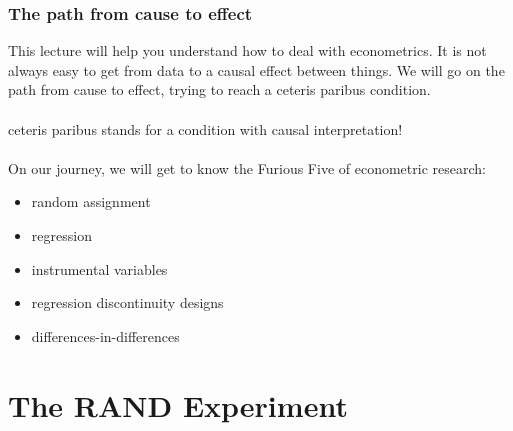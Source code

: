 \documentclass{beamer}
\begin{document}
\begin{frame}
\frametitle{The path from cause to effect}
This lecture will help you understand how to deal with econometrics. It is not always easy to get from data to a causal effect between things.
We will go on the path from cause to effect, trying to reach a ceteris paribus condition. \\~\\

ceteris paribus stands for a condition with causal interpretation!\\~\\

On our journey, we will get to know the Furious Five of econometric research:
\begin{itemize}
\item random assignment
\item regression
\item instrumental variables
\item regression discontinuity designs
\item differences-in-differences
\end{itemize}

\end{frame}

\section{The RAND Experiment} %


\end{document}
